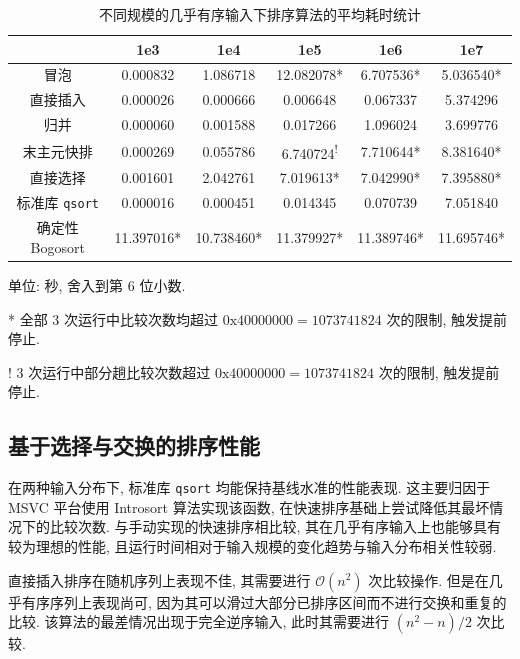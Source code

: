\documentclass[12pt]{article}
\begin{document}
\begin{table}
\centering
\begin{threeparttable}
    \caption{不同规模的几乎有序输入下排序算法的平均耗时统计}
    \begin{tabular}{cccccc}
        \toprule
         & 1e3 & 1e4 & 1e5 & 1e6 & 1e7 \\
        \midrule
        冒泡 & 0.000832 & 1.086718 & 12.082078* & 6.707536* & 5.036540* \\
        直接插入 & 0.000026 & 0.000666 & 0.006648 & 0.067337 & 5.374296 \\
        归并 & 0.000060 & 0.001588 & 0.017266 & 1.096024 & 3.699776 \\
        末主元快排 & 0.000269 & 0.055786 & 6.740724\textsuperscript{!} & 7.710644* & 8.381640* \\
        直接选择 & 0.001601 & 2.042761 & 7.019613* & 7.042990* & 7.395880* \\
        标准库 \texttt{qsort} & 0.000016 & 0.000451 & 0.014345 & 0.070739 & 7.051840 \\
        确定性 Bogosort & 11.397016* & 10.738460* & 11.379927* & 11.389746* & 11.695746* \\
        \bottomrule
    \end{tabular}
    \begin{tablenotes}
        \small
        \item 单位: 秒, 舍入到第 6 位小数.
        \item[*] 全部 3 次运行中比较次数均超过 $0\mathrm{x}40000000 = 1073741824$ 次的限制, 触发提前停止.
        \item[!] 3 次运行中部分趟比较次数超过 $0\mathrm{x}40000000 = 1073741824$ 次的限制, 触发提前停止.
    \end{tablenotes}
    \label{table_result_almost_rising}
\end{threeparttable}
\end{table}

\subsection{基于选择与交换的排序性能}

在两种输入分布下, 标准库 \texttt{qsort} 均能保持基线水准的性能表现. 这主要归因于 MSVC 平台使用 Introsort 算法实现该函数, 在快速排序基础上尝试降低其最坏情况下的比较次数. 与手动实现的快速排序相比较, 其在几乎有序输入上也能够具有较为理想的性能, 且运行时间相对于输入规模的变化趋势与输入分布相关性较弱.

直接插入排序在随机序列上表现不佳, 其需要进行 $\mathcal{O}(n^2)$ 次比较操作. 但是在几乎有序序列上表现尚可, 因为其可以滑过大部分已排序区间而不进行交换和重复的比较. 该算法的最差情况出现于完全逆序输入, 此时其需要进行 $(n^2 - n) / 2$ 次比较.
\end{document}
